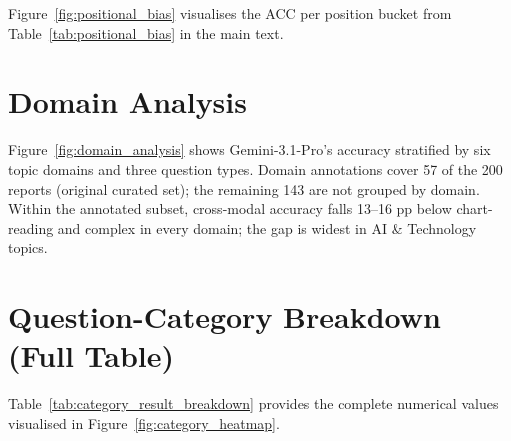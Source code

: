 \documentclass{article} %
\begin{document}
Figure~\ref{fig:positional_bias} visualises the ACC per position bucket from Table~\ref{tab:positional_bias} in the main text.

\FloatBarrier
\section{Domain Analysis}
\label{app:domain_analysis}

Figure~\ref{fig:domain_analysis} shows Gemini-3.1-Pro's accuracy stratified by six topic domains and three question types. Domain annotations cover 57 of the 200 reports (original curated set); the remaining 143 are not grouped by domain. Within the annotated subset, cross-modal accuracy falls 13--16 pp below chart-reading and complex in every domain; the gap is widest in AI \& Technology topics.

\FloatBarrier
\section{Question-Category Breakdown (Full Table)}
\label{app:category_table}

Table~\ref{tab:category_result_breakdown} provides the complete numerical values
visualised in Figure~\ref{fig:category_heatmap}.
\end{document}

